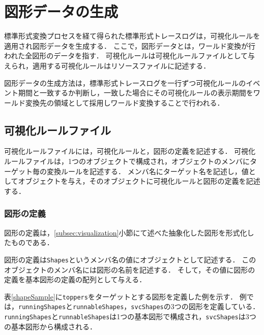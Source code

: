 \section{図形データの生成}

標準形式変換プロセスを経て得られた標準形式トレースログは，可視化ルールを適用され図形データを生成する．
ここで，図形データとは，ワールド変換が行われた全図形のデータを指す．
可視化ルールは可視化ルールファイルとして与えられ，適用する可視化ルールはリソースファイルに記述する．

図形データの生成方法は，標準形式トレースログを一行ずつ可視化ルールのイベント期間と一致するか判断し，一致した場合にその可視化ルールの表示期間をワールド変換先の領域として採用しワールド変換することで行われる．

\subsection{可視化ルールファイル}
\label{visualizeRuleSection}
可視化ルールファイルには，可視化ルールと，図形の定義を記述する．
可視化ルールファイルは，1つのオブジェクトで構成され，オブジェクトのメンバにターゲット毎の変換ルールを記述する．
メンバ名にターゲット名を記述し，値としてオブジェクトを与え，そのオブジェクトに可視化ルールと図形の定義を記述する．

\subsubsection{図形の定義}

図形の定義は，\ref{subsec:visualization}小節にて述べた抽象化した図形を形式化したものである．

図形の定義は{\tt Shapes}というメンバ名の値にオブジェクトとして記述する．
このオブジェクトのメンバ名には図形の名前を記述する．
そして，その値に図形の定義を基本図形の定義の配列として与える．

表\ref{shapeSample}に{\tt toppers}をターゲットとする図形を定義した例を示す．
例では，{\tt runningShapes}と{\tt runnableShapes}，{\tt svcShapes}の3つの図形を定義している．
{\tt runningShapes}と{\tt runnableShapes}は1つの基本図形で構成され，{\tt svcShapes}は3つの基本図形から構成される．


